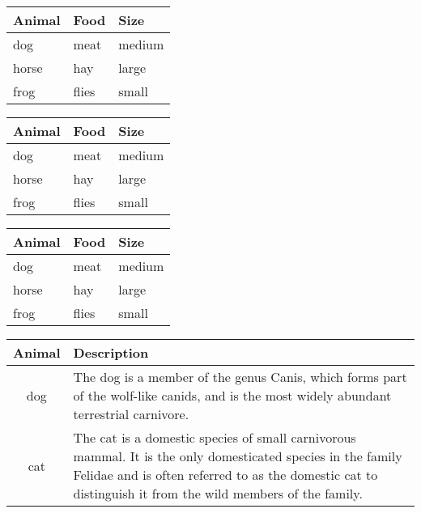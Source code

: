 \documentclass{article}
\begin{document}
\newpage

\begin{tabular}{lll}
  \toprule
  Animal & Food  & Size   \\
  \midrule
  dog    & meat  & medium \\
  horse  & hay   & large  \\
  frog   & flies & small  \\
  \bottomrule
\end{tabular}

\vspace{1cm}

\begin{tabular}{lll}
  \toprule
  Animal & Food  & Size    \\
  \midrule
  dog    & meat  & medium  \\
  \cmidrule{1-2}
  horse  & hay   & large   \\
  \cmidrule{1-1}
  \cmidrule{3-3}
  frog   & flies & small   \\
  \bottomrule
\end{tabular}

\vspace{1cm}

\begin{tabular}{lll}
  \toprule
  Animal & Food  & Size   \\
  \midrule
  dog    & meat  & medium \\
  \cmidrule{1-2}
  horse  & hay   & large  \\
  \cmidrule(r){1-1}
  \cmidrule(rl){2-2}
  \cmidrule(l){3-3}
  frog   & flies & small  \\
  \bottomrule
\end{tabular}

\vspace{1cm}

\begin{tabular}{cp{9cm}}
  \toprule
  Animal & Description \\
  \midrule
  dog    & The dog is a member of the genus Canis, which forms part of the
           wolf-like canids, and is the most widely abundant terrestrial
           carnivore. \\
  \addlinespace
  cat    & The cat is a domestic species of small carnivorous mammal. It is the
           only domesticated species in the family Felidae and is often referred
           to as the domestic cat to distinguish it from the wild members of the
           family. \\
  \bottomrule
\end{tabular}
\end{document}
